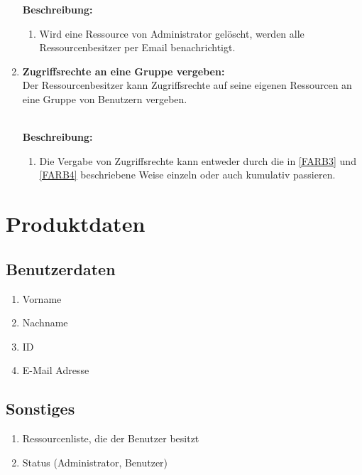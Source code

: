 \documentclass[parskip=full,11pt]{scrartcl}
\def\threedigits#1{%
  \ifnum#1<10 0\fi
  \ifnum#1<1 0\fi
  \number#1}
\begin{document}
\begin{enumerate}[label={\textbf{/F\protect\threedigits{\theenumi}0/}}, leftmargin=*, resume]
\textbf{Beschreibung:}\\
\begin{enumerate}[label=(\arabic*), leftmargin=*]
\item Wird eine Ressource von Administrator gelöscht, werden alle Ressourcenbesitzer per Email benachrichtigt.
\end{enumerate}
\item \label{FARB8} \colorbox{shadecolor} {\textbf{Zugriffsrechte an eine Gruppe vergeben:}}\\
Der Ressourcenbesitzer kann Zugriffsrechte auf seine eigenen Ressourcen an eine Gruppe von Benutzern vergeben.\\\

\textbf{Beschreibung:}\\
\begin{enumerate}[label=(\arabic*), leftmargin=*]
\item Die Vergabe von Zugriffsrechte kann entweder durch die in \ref{FARB3} und \ref{FARB4} beschriebene Weise einzeln oder auch kumulativ passieren.
\end{enumerate}

\end{enumerate}


\section{Produktdaten}
\subsection{Benutzerdaten}
\begin{enumerate}[label={\textbf{/D\protect\threedigits{\theenumi}0/}}, leftmargin=*]
     		\item Vorname
     		\item Nachname
     		\item ID
     		\item E-Mail Adresse 
\end{enumerate}
     		 
\subsection{Sonstiges}
\begin{enumerate}[label={\textbf{/D\protect\threedigits{\theenumi}0/}}, leftmargin=*, resume]
		\item Ressourcenliste, die der Benutzer besitzt
        	\item Status (Administrator, Benutzer)     
\end{enumerate}
\end{document}

